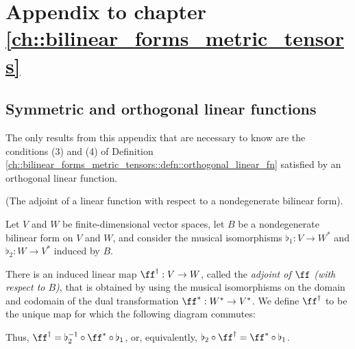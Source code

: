 \chapter{Appendix to chapter \ref{ch::bilinear_forms_metric_tensors}}

\section*{Symmetric and orthogonal linear functions}

The only results from this appendix that are necessary to know are the conditions (3) and (4) of Definition \ref{ch::bilinear_forms_metric_tensors::defn::orthogonal_linear_fn} satisfied by an orthogonal linear function.

\begin{deriv}
\label{ch::bilinear_forms_metric_tensors::defn::dual_transf_after_id}
    (The adjoint of a linear function with respect to a nondegenerate bilinear form).
    
    Let $V$ and $W$ be finite-dimensional vector spaces, let $B$ be a nondegenerate bilinear form on $V$ and $W$, and consider the musical isomorphisms $\flat_1:V \rightarrow W^{*}$ and $\flat_2:W \rightarrow V^{*}$ induced by $B$.
    
    There is an induced linear map $\ff^\dag:V \rightarrow W$, called the \textit{adjoint of $\ff$ (with respect to $B$)}, that is obtained by using the musical isomorphisms on the domain and codomain of the dual transformation $\ff^*:W^* \rightarrow V^*$. We define $\ff^\dag$ to be the unique map for which the following diagram commutes:
    
    \begin{center}
    \end{center}
    
    Thus, $\ff^\dag = \flat_2^{-1} \circ \ff^* \circ \flat_1$, or, equivalently, $\flat_2 \circ \ff^\dag = \ff^* \circ \flat_1$.
    

\end{deriv}
